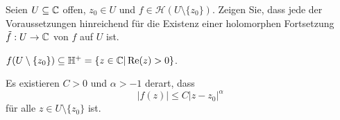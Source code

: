 \begin{Problem}
	Seien $U\subseteq \mathbb{C}$ offen, $z_0\in U$ und $f\in \mathcal{H}(U\setminus \{z_0\} )$. Zeigen Sie, dass jede der Voraussetzungen hinreichend für die Existenz einer holomorphen Fortsetzung $\tilde{f}:U\to \mathbb{C}$ von $f$ auf $U$ ist.
	\begin{parts}
		\item $f(U\setminus \{z_0\} )\subseteq \mathbb{H}^+=\{z\in \mathbb{C}|\Re(z)>0\} $.
		\item Es existieren $C>0$ und $\alpha>-1$ derart, dass
			\[
			|f(z)|\le C|z-z_0|^\alpha
		\]
		für alle $z\in U\setminus \{z_0\} $ ist.
	\end{parts}
\end{Problem}
